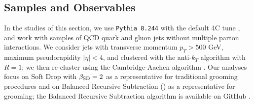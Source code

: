 \documentclass[letterpaper,11pt]{article}
\begin{document}
\subsection{Samples and Observables}
In the studies of this section, we use \texttt{Pythia 8.244} \cite{Sjostrand:2014zea} with the default 4C tune \cite{Corke:2010yf}, and work with samples of QCD quark and gluon jets without multiple parton interactions.
%
We consider jets with transverse momentum \(p_T > 500\) GeV, maximum pseudorapidity \(|\eta| < 4\), and clustered with the anti-\(k_T\) algorithm \cite{Cacciari:2008gp} with \(R = 1\);
%
we then re-cluster using the Cambridge-Aachen algorithm \cite{Dokshitzer:1997in}.
%
Our analyses focus on Soft Drop with \(\beta_{\rm SD} = 2\) as a representative for traditional grooming procedures and on Balanced Recursive Subtraction () as a representative for \PIRANHA{} grooming;
%
the Balanced Recursive Subtraction algorithm is available on GitHub \cite{piranhagithub}.
\end{document}
